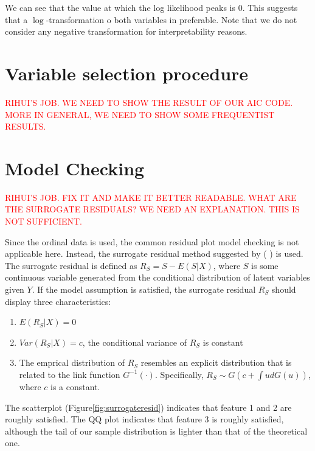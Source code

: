 \documentclass[10pt]{jmlr}%
\begin{document}
We can see that the value at which the log likelihood peaks is 0. This suggests that a $\log$-transformation o  both variables in preferable. Note that we do not consider any negative transformation for interpretability reasons. 



\section{Variable selection procedure}
\textcolor{red}{RIHUI'S JOB. WE NEED TO SHOW THE RESULT OF OUR AIC CODE. MORE IN GENERAL, WE NEED TO SHOW SOME FREQUENTIST RESULTS.}
\section{Model Checking}
\textcolor{red}{RIHUI'S JOB. FIX IT AND MAKE IT BETTER READABLE. WHAT ARE THE SURROGATE RESIDUALS? WE NEED AN EXPLANATION. THIS IS NOT SUFFICIENT.}

Since the ordinal data is used, the common residual plot model checking is not applicable here. Instead, the surrogate residual method suggested by (%
) is used. The surrogate residual is defined as $R_S=S-E(S|X)$, where $S$ is some continuous variable generated from the conditional distribution of latent variables given $Y$. If the model assumption is satisfied, the surrogate residual $R_S$ should display three characteristics: 

\begin{enumerate}
	\item $E(R_S|X)=0$
	\item $Var(R_S|X)=c$, the conditional variance of $R_S$ is constant
	\item The emprical distribution of $R_S$ resembles an explicit distribution that is related to the link function $G^{-1}(\cdot)$. Specifically, $R_S\sim G(c+\int ud G(u))$, where $c$ is a constant.
\end{enumerate}

The scatterplot (Figure\ref{fig:surrogateresid}) indicates that feature 1 and 2 are roughly satisfied. The QQ plot indicates that feature 3 is roughly satisfied, although the tail of our sample distribution is lighter than that of the theoretical one. 
\end{document}
